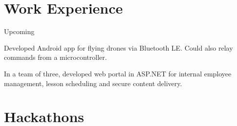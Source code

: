 \documentclass[]{deedy-resume-openfont}
\begin{document}
\begin{minipage}[t]{0.33\textwidth}



%
%

\end{minipage} 
\hfill
\begin{minipage}[t]{0.66\textwidth} 


\section{Work Experience}

\vspace{\topsep} %
\begin{tightemize}
\item Upcoming
\end{tightemize}
\sectionsep

\begin{tightemize}
\item Developed Android app for flying drones via Bluetooth LE. Could also relay commands from a microcontroller.
\item In a team of three, developed web portal in ASP.NET for internal employee management, lesson scheduling and secure content delivery.
\end{tightemize}
\sectionsep


\section{Hackathons}


\end{minipage}
\end{document}
